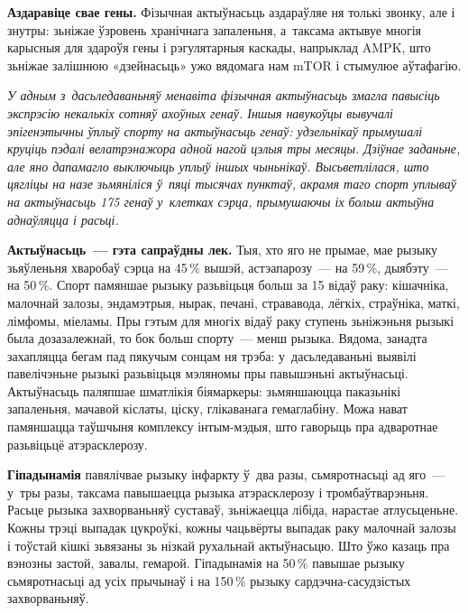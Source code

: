 \textbf{Аздаравіце свае гены.} Фізычная актыўнасьць аздараўляе ня толькі звонку, але і знутры: зьніжае ўзровень хранічнага запаленьня, а~таксама актывуе многія карысныя для здароўя гены і рэгулятарныя каскады, напрыклад AMPK, што зьніжае залішнюю «дзейнасьць» ужо вядомага нам mTOR і стымулюе аўтафагію.

\emph{У адным з~дасьледаваньняў менавіта фізычная актыўнасьць змагла павысіць экспрэсію некалькіх сотняў ахоўных генаў. Іншыя навукоўцы вывучалі эпігенэтычны ўплыў спорту на актыўнасьць генаў: удзельнікаў прымушалі круціць пэдалі велатрэнажора адной нагой цэлыя тры месяцы. Дзіўнае заданьне, але яно дапамагло выключыць уплыў іншых чыньнікаў. Высьветлілася, што цягліцы на назе зьмяніліся ў~пяці тысячах пунктаў, акрамя таго спорт уплываў на актыўнасьць 175 генаў у~клетках сэрца, прымушаючы іх больш актыўна аднаўляцца і расьці.}

\textbf{Актыўнасьць~--- гэта сапраўдны лек.} Тыя, хто яго не прымае, мае рызыку зьяўленьня хваробаў сэрца на 45\,\% вышэй, астэапарозу~--- на 59\,\%, дыябэту~--- на 50\,\%. Спорт памяншае рызыку разьвіцьця больш за 15 відаў раку: кішачніка, малочнай залозы, эндамэтрыя, нырак, печані, стрававода, лёгкіх, страўніка, маткі, лімфомы, міеламы. Пры гэтым для многіх відаў раку ступень зьніжэньня рызыкі была дозазалежнай, то бок больш спорту~--- менш рызыка. Вядома, занадта захапляцца бегам пад пякучым сонцам ня трэба: у~дасьледаваньні выявілі павелічэньне рызыкі разьвіцьця мэляномы пры павышэньні актыўнасьці. Актыўнасьць паляпшае шматлікія біямаркеры: зьмяншаюцца паказьнікі запаленьня, мачавой кіслаты, ціску, глікаванага гемаглабіну. Можа нават памяншацца таўшчыня комплексу інтым-мэдыя, што гаворыць пра адваротнае разьвіцьцё атэрасклерозу.


\textbf{Гіпадынамія} павялічвае рызыку інфаркту ў~два разы, сьмяротнасьці ад яго~--- у~тры разы, таксама павышаецца рызыка атэрасклерозу і тромбаўтварэньня. Расьце рызыка захворваньняў суставаў, зьніжаецца лібіда, нарастае атлусьценьне. Кожны трэці выпадак цукроўкі, кожны чацьвёрты выпадак раку малочнай залозы і тоўстай кішкі зьвязаны зь нізкай рухальнай актыўнасьцю. Што ўжо казаць пра вэнозны застой, завалы, гемарой. Гіпадынамія на 50\,\% павышае рызыку сьмяротнасьці ад усіх прычынаў і на 150\,\% рызыку сардэчна-сасудзістых захворваньняў.

